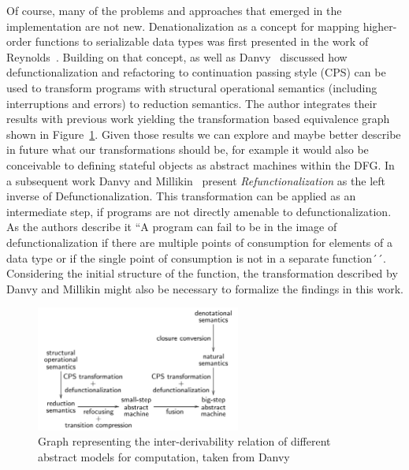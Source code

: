 Of course, many of the problems and approaches that emerged in the implementation are not new. Denationalization as a concept for mapping higher-order functions to serializable data types was first presented in the work of Reynolds~\cite{reynolds1972definitional}. Building on that concept, as well as Danvy~\cite{danvy2008defunctionalized} discussed how defunctionalization and refactoring to continuation passing style (CPS) can be used to transform programs with structural operational semantics (including interruptions and errors) to reduction semantics. The author integrates their results with previous work yielding the transformation based equivalence graph shown in Figure~\ref{fig:transformationsDanvy}. Given those results we can explore and maybe better describe in future what our transformations should be, for example it would also be conceivable to defining stateful objects as abstract machines within the DFG. In a subsequent work Danvy and Millikin~\cite{DANVY2009534} present \emph{Refunctionalization} as the left inverse of Defunctionalization. This transformation can be applied as an intermediate step, if programs are not directly amenable to defunctionalization. As the authors describe it ``A program can fail to be in the image of defunctionalization if there are multiple points of consumption for elements of a data type or if the single point of consumption is not in a separate function´´. Considering the initial structure of the  function, the transformation described by Danvy and Millikin might also be necessary to formalize the findings in this work.

\begin{figure}[H]
\centering
   \includegraphics[width=0.6\textwidth]{figures/transformations_danvy.png}
\caption{Graph representing the inter-derivability relation of different abstract models for computation, taken from Danvy~\cite{danvy2008defunctionalized}}
\label{fig:transformationsDanvy}
\end{figure}

